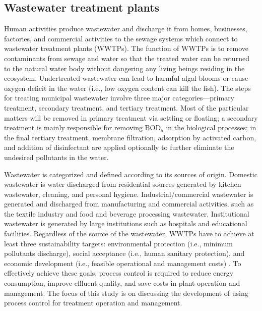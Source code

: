 \subsection{Wastewater treatment plants}
Human activities produce wastewater and discharge it from homes, businesses, factories, and commercial activities to the sewage systems which connect to wastewater treatment plants (WWTPs). The function of  WWTPs is to remove contaminants from sewage and water so that the treated water can be returned to the natural water body without dangering any living beings residing in the ecosystem. Undertreated wastewater can lead to harmful algal blooms or cause oxygen deficit in the water (i.e., low oxygen content can kill the fish). The steps for treating municipal wastewater involve three major categories---primary treatment, secondary treatment, and tertiary treatment. Most of the particular matters will be removed in primary treatment via settling or floating; a secondary treatment is mainly responsible for removing BOD$_5$ in the biological processes; in the final tertiary treatment, membrane filtration, adsorption by activated carbon, and addition of disinfectant are applied optionally to further eliminate the undesired pollutants in the water.

Wastewater is categorized and defined according to its sources of origin. Domestic wastewater is water discharged from residential sources generated by kitchen wastewater, cleaning, and personal hygiene. Industrial/commercial wastewater is generated and discharged from manufacturing and commercial activities, such as the textile industry and food and beverage processing wastewater. Institutional wastewater is generated by large institutions such as hospitals and educational facilities. Regardless of the source of the wastewater, WWTPs have to achieve at least three sustainability targets: environmental protection (i.e., minimum pollutants discharge), social acceptance (i.e., human sanitary protection), and economic development (i.e., feasible operational and management costs) \citep{manninaDecisionSupportSystems2019}. To effectively achieve these goals, process control is required to reduce energy consumption, improve effluent quality, and save costs in plant operation and management. The focus of this study is on discussing the development of using process control for treatment operation and management.

